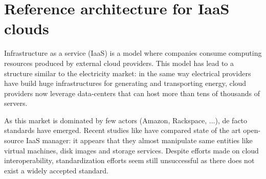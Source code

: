 \section{Reference architecture for IaaS clouds}
\label{sec:moreno}







Infrastructure as a service (IaaS) is a model where companies consume computing
resources produced by external cloud providers. This model has lead to a 
structure similar to the electricity market: in the same way electrical 
providers have build huge infrastructures for generating and transporting 
energy, cloud providers now leverage data-centers that can host more than tens 
of thousands of servers.

As this market is dominated by few actors (Amazon, Rackspace, ...), de facto
standards have emerged. Recent studies like \cite{peng:2009} have compared state
of the art open-source IaaS manager: it appears that they almost manipulate same
entities like virtual machines, disk images and storage services. Despite 
efforts made on cloud interoperability, standardization efforts seem still
unsuccessful as there does not exist a widely accepted standard.

